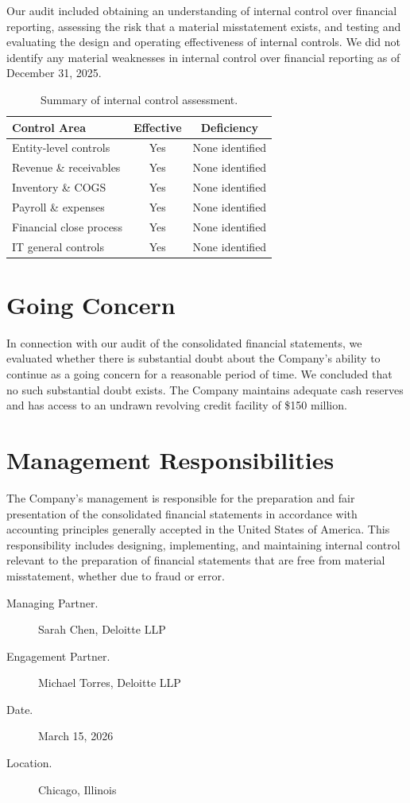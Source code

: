 \documentclass[
    language=english,
    doctype=audit-report,
    institution=none,
]{../../omnilatex}
\begin{document}
Our audit included obtaining an understanding of internal control over
financial reporting, assessing the risk that a material misstatement exists,
and testing and evaluating the design and operating effectiveness of internal
controls. We did not identify any material weaknesses in internal control
over financial reporting as of December 31, 2025.

\begin{table}[h]
    \centering
    \begin{tabular}{lcc}
        \toprule
        \textbf{Control Area} & \textbf{Effective} & \textbf{Deficiency} \\
        \midrule
        Entity-level controls & Yes & None identified \\
        Revenue \& receivables & Yes & None identified \\
        Inventory \& COGS & Yes & None identified \\
        Payroll \& expenses & Yes & None identified \\
        Financial close process & Yes & None identified \\
        IT general controls & Yes & None identified \\
        \bottomrule
    \end{tabular}
    \caption{Summary of internal control assessment.}
\end{table}

\section{Going Concern}

In connection with our audit of the consolidated financial statements, we
evaluated whether there is substantial doubt about the Company's ability to
continue as a going concern for a reasonable period of time. We concluded
that no such substantial doubt exists. The Company maintains adequate cash
reserves and has access to an undrawn revolving credit facility of
\$150 million.

\section{Management Responsibilities}

The Company's management is responsible for the preparation and fair
presentation of the consolidated financial statements in accordance with
accounting principles generally accepted in the United States of America.
This responsibility includes designing, implementing, and maintaining
internal control relevant to the preparation of financial statements that
are free from material misstatement, whether due to fraud or error.

\begin{description}
    \item[Managing Partner.] Sarah Chen, Deloitte LLP
    \item[Engagement Partner.] Michael Torres, Deloitte LLP
    \item[Date.] March 15, 2026
    \item[Location.] Chicago, Illinois
\end{description}
\end{document}
